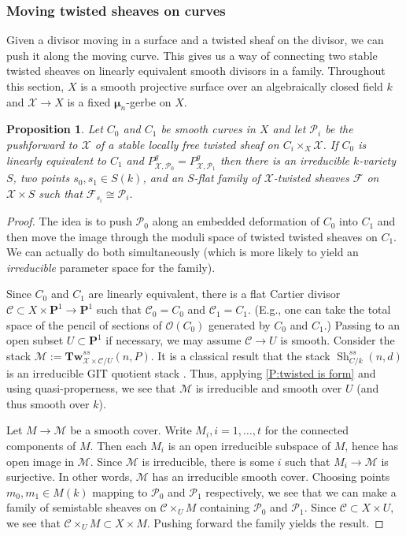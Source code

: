 \documentclass[11pt]{amsart}
\newcommand{\field}[1]{\mathbf #1}
\newcommand{\mc}[1]{\mathcal #1}
\newcommand{\ms}[1]{\mathscr #1}
\DeclareMathOperator{\sh}{Sh}
\renewcommand{\P}{\field P}
\newcommand{\m}{\boldsymbol{\mu}}
\renewcommand{\[}{[\!\hspace{0.03em}[}
\renewcommand{\]}{]\!\hspace{0.03em}]}
\renewcommand{\(}{(\!\hspace{0.03em}(}
\renewcommand{\)}{)\!\hspace{0.03em})}
\newcommand{\Tw}{\mathbf{Tw}}
\newtheorem{prop}[lem]{Proposition}
\theoremstyle{definition}
\theoremstyle{remark}
\begin{document}
\subsubsection{Moving twisted sheaves on curves}
Given a divisor moving in a surface and a twisted sheaf on the 
divisor, we can push it along the moving curve.  This gives us a way 
of connecting two stable twisted sheaves on linearly equivalent 
smooth divisors in a family.  Throughout this section, $X$ is a 
smooth projective surface over an algebraically closed field $k$ and 
$\ms X\to X$ is a fixed $\m_{n}$-gerbe on $X$.

\begin{prop}\label{P:moving sheaves on curves} Let 
$C_{0}$ and $C_{1}$ be smooth curves in $X$ and let $\ms P_{i}$ be the 
pushforward to $\ms X$ of a stable locally free twisted sheaf on 
$C_{i}\times_{X}\ms X$. If $C_{0}$ 
is linearly equivalent to $C_{1}$ and $P^{g}_{\ms X,\ms 
P_{0}}=P^{g}_{\ms X,\ms P_{1}}$ then there is an irreducible $k$-variety $S$, 
two points $s_{0},s_{1}\in S(k)$, and an $S$-flat family of 
$\ms X$-twisted sheaves $\ms F$ on $\ms X\times S$ such that $\ms F_{s_{i}}\cong\ms P_{i}$.
\end{prop}
\begin{proof} The idea is to push $\ms P_{0}$ along an embedded 
deformation of $C_{0}$ into $C_{1}$ and then move the image through 
the moduli space of twisted twisted sheaves on $C_{1}$.  We can 
actually do both simultaneously (which is more likely to yield an 
\emph{irreducible\/} parameter space for the family).

Since $C_{0}$ and $C_{1}$ are linearly equivalent, there is a flat Cartier divisor $\mc C\subset 
X\times\P^{1}\to\P^{1}$ such that $\mc C_{0}=C_{0}$ and $\mc 
C_{1}=C_{1}$.  (E.g., one can take the total space of the pencil of 
sections of ${\ms O}(C_{0})$ generated by $C_{0}$ and $C_{1}$.)  
Passing to an open subset $U\subset\P^{1}$ if necessary, we may assume 
$\mc C\to U$ is smooth.  Consider the stack $\ms M:=\Tw^{ss}_{\ms X\times\mc 
C/U}(n,P)$.  It is a classical result that the stack $\sh^{ss}_{C/k}(n,d)$ 
is an irreducible GIT quotient stack \cite[Appendix 5C]{git}.  Thus, applying 
\ref{P:twisted is form} and using quasi-properness, we see that $\ms 
M$ is irreducible and smooth over $U$ (and thus smooth over $k$).

Let $M\to\ms M$ be a 
smooth cover.  Write $M_{i},i=1,\ldots,t$ for the connected 
components of $M$.  Then each $M_{i}$ is an open irreducible subspace of $M$, 
hence has open image in $\ms M$.  Since $\ms M$ is irreducible, there 
is some $i$ such that $M_{i}\to\ms M$ is surjective.  In 
other words, $\ms M$ has an irreducible smooth cover.  Choosing points 
$m_{0},m_{1}\in M(k)$ mapping to $\ms P_{0}$ and $\ms P_{1}$ 
respectively, we see that we can make a family of semistable sheaves 
on $\mc C\times_{U}M$ containing $\ms P_{0}$ and $\ms P_{1}$.  
Since $\mc C\subset X\times U$, we see that $\mc 
C\times_{U}M\subset X\times M$.  Pushing forward the family yields 
the result.
\end{proof}
\end{document}
